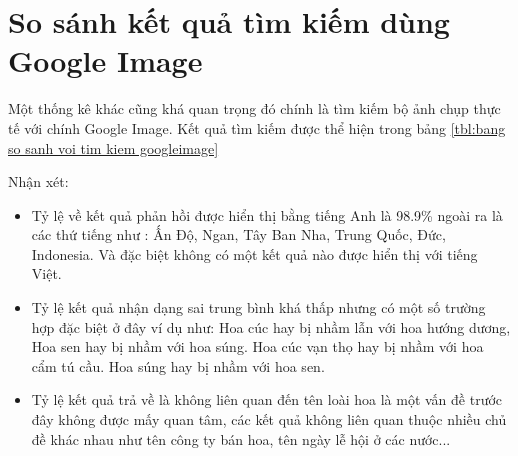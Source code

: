 \documentclass[12pt]{report}
\begin{document}
		\section{So sánh kết quả tìm kiếm dùng Google Image}
		Một thống kê khác cũng khá quan trọng đó chính là tìm kiếm bộ ảnh chụp thực tế với chính Google Image.
		Kết quả tìm kiếm được thể hiện trong bảng \ref{tbl:bang so sanh voi tim kiem googleimage}
		
		Nhận xét:
		\begin{itemize}
			\item Tỷ lệ về kết quả phản hồi được hiển thị bằng tiếng Anh là 98.9\% ngoài ra là các thứ tiếng như : Ấn Độ, Ngan, Tây Ban Nha, Trung Quốc, Đức, Indonesia. Và đặc biệt không có một kết quả nào được hiển thị với tiếng Việt.
			\item Tỷ lệ kết quả nhận dạng sai trung bình khá thấp nhưng có một số trường hợp đặc biệt ở đây ví dụ như: Hoa cúc hay bị nhầm lẫn với hoa hướng dương, Hoa sen hay bị nhầm với hoa súng. 
			Hoa cúc vạn thọ hay bị nhầm với hoa cẩm tú cầu. Hoa súng hay bị nhầm với hoa sen.
			\item Tỷ lệ kết quả trả về là không liên quan đến tên loài hoa là một vấn đề trước đây không được mấy quan tâm, các kết quả không liên quan thuộc nhiều chủ đề khác nhau như tên công ty bán hoa, tên ngày lễ hội ở các nước...
		\end{itemize}
\end{document}
